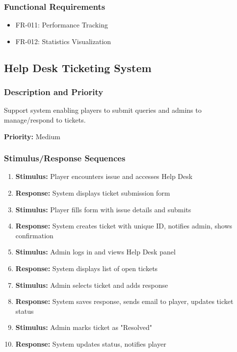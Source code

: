\documentclass[12pt,a4paper]{article}
\begin{document}
\begin{enumerate}
\subsubsection{Functional Requirements}
\begin{itemize}
    \item FR-011: Performance Tracking
    \item FR-012: Statistics Visualization
\end{itemize}

\subsection{Help Desk Ticketing System}

\subsubsection{Description and Priority}
Support system enabling players to submit queries and admins to manage/respond to tickets.

\textbf{Priority:} Medium

\subsubsection{Stimulus/Response Sequences}
\begin{enumerate}
    \item \textbf{Stimulus:} Player encounters issue and accesses Help Desk
    \item \textbf{Response:} System displays ticket submission form
    \item \textbf{Stimulus:} Player fills form with issue details and submits
    \item \textbf{Response:} System creates ticket with unique ID, notifies admin, shows confirmation
    \item \textbf{Stimulus:} Admin logs in and views Help Desk panel
    \item \textbf{Response:} System displays list of open tickets
    \item \textbf{Stimulus:} Admin selects ticket and adds response
    \item \textbf{Response:} System saves response, sends email to player, updates ticket status
    \item \textbf{Stimulus:} Admin marks ticket as "Resolved"
    \item \textbf{Response:} System updates status, notifies player
\end{enumerate}


\end{enumerate}
\end{document}
